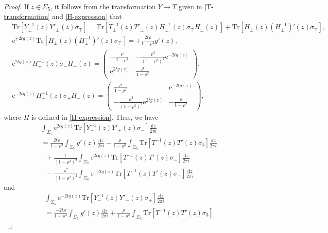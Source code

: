 \documentclass[11pt,a4paper]{article}
\numberwithin{equation}{section}
\begin{document}
\begin{proof}
If $z\in\Sigma_5$, it follows from the transformation $Y \to T$ given in \eqref{T-transformation} and \eqref{H-expression} that
\begin{align*}
&\mathrm{Tr}\left[Y^{-1}_{\pm}(z)Y'_{\pm}(z)\sigma_{\mp}\right]=
\mathrm{Tr}\left[T^{-1}_{\pm}(z)T'_{\pm}(z)H^{-1}_{\pm}(z)\sigma_{\mp}H_{\pm}(z)\right]+
\mathrm{Tr}\left[H_{\pm}(z)(H_{\pm}^{-1})'(z)\sigma_{\mp}\right],\\
&\mathrm{e}^{\pm2tg(z)}\mathrm{Tr}\left[H_{\pm}(z)(H_{\pm}^{-1})'(z)\sigma_{\mp}\right]=
\pm\frac{2t\rho}{1-\rho^2}g'(z),\\
&\mathrm{e}^{2tg(z)}H_{+}^{-1}(z)\sigma_{-}H_{+}(z)=\begin{pmatrix} -\frac{\rho}{1-\rho^2} & -\frac{\rho^2}{(1-\rho^2)^2}\mathrm{e}^{-2tg(z)} \\
\mathrm{e}^{2tg(z)} & \frac{\rho}{1-\rho^2} \end{pmatrix},\\
&\mathrm{e}^{-2tg(z)}H_{-}^{-1}(z)\sigma_{+}H_{-}(z)=\begin{pmatrix} \frac{\rho}{1-\rho^2} & \mathrm{e}^{-2tg(z)} \\ -\frac{\rho^2}{(1-\rho^2)^2}\mathrm{e}^{2tg(z)}
 & -\frac{\rho}{1-\rho^2} \end{pmatrix},
\end{align*}
where $H$ is defined in \eqref{H-expression}. Thus, we have
\begin{align}\nonumber
&\int_{\Sigma_5}\mathrm{e}^{2tg(z)}
\mathrm{Tr}\left[Y_+^{-1}(z)Y'_+(z)\sigma_-\right]\frac{\mathrm{d}z}{2\pi i}\\ \nonumber
&=\frac{2t\rho}{1-\rho^2}\int_{\Sigma_5}g'(z)\frac{\mathrm{d}z}{2\pi i}-\frac{\rho}{1-\rho^2}\int_{\Sigma_5}\mathrm{Tr}\left[T^{-1}(z)T'(z)\sigma_3\right]
\frac{\mathrm{d}z}{2\pi i}\\ \label{eq:intSigma5a}
&~~~+\frac{1}{(1-\rho^2)^2}\int_{\Sigma_7}\mathrm{e}^{2tg(z)}
\mathrm{Tr}\left[T^{-1}(z)T'(z)\sigma_-\right]\frac{\mathrm{d}z}{2\pi i}\nonumber\\
&~~~-\frac{\rho^2}{(1-\rho^2)^2}\int_{\Sigma_6}\mathrm{e}^{-2tg(z)}
\mathrm{Tr}\left[T^{-1}(z)T'(z)\sigma_+\right]\frac{\mathrm{d}z}{2\pi i}
\end{align}
and
\begin{align} \nonumber
&\int_{\Sigma_5}\mathrm{e}^{-2tg(z)}
\mathrm{Tr}\left[Y_-^{-1}(z)Y'_-(z)\sigma_+\right]\frac{\mathrm{d}z}{2\pi i}\\  \nonumber
&=\frac{-2t\rho}{1-\rho^2}\int_{\Sigma_5}g'(z)\frac{\mathrm{d}z}{2\pi i}+\frac{\rho}{1-\rho^2}\int_{\Sigma_5}\mathrm{Tr}\left[T^{-1}(z)T'(z)\sigma_3\right]

\end{align}
\end{proof}
\end{document}
